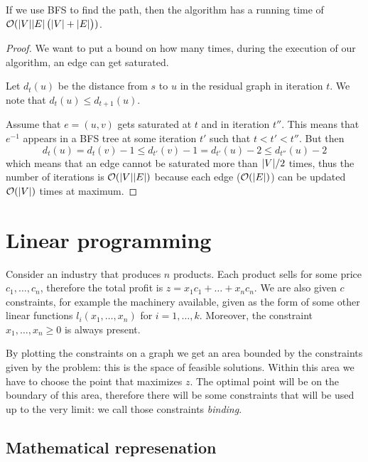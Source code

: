\documentclass[12pt]{extarticle}
\begin{document}
\begin{theorem}
    If we use BFS to find the path, then the algorithm has a running time of $\mathcal{O}(\abs{V} \abs{E} \left( \abs{V} + \abs{E} \right))$.
\end{theorem}

\begin{proof}
    We want to put a bound on how many times, during the execution of our algorithm, an edge can get saturated.

    Let $d_t(u)$ be the distance from $s$ to $u$ in the residual graph in iteration $t$.
    We note that $d_t(u) \leq d_{t+1}(u)$.

    Assume that $e = (u, v)$ gets saturated at $t$ and in iteration $t''$.
    This means that $e^{-1}$ appears in a BFS tree at some iteration $t'$ such that $t < t' < t''$.
    But then
    \begin{equation}
        d_t(u) = d_t(v)-1 \leq d_{t'}(v)-1 = d_{t'}(u)-2 \leq d_{t''}(u)-2
    \end{equation}
    which means that an edge cannot be saturated more than $\abs{V}/2$ times,
    thus the number of iterations is $\mathcal{O}(\abs{V}\abs{E})$ because each edge ($\mathcal{O}(\abs{E})$) can be updated $\mathcal{O}(\abs{V})$ times at maximum.
\end{proof}

\section{Linear programming}

Consider an industry that produces $n$ products.
Each product sells for some price $c_1, \ldots, c_n$, therefore the total profit is $z = x_1 c_1 + \dots + x_n c_n$.
We are also given $c$ constraints, for example the machinery available, given as the form of some other linear functions $l_i(x_1, \ldots, x_n)$ for $i = 1, \ldots, k$.
Moreover, the constraint $x_1, \ldots, x_n \geq 0$ is always present.

By plotting the constraints on a graph we get an area bounded by the constraints given by the problem: this is the space of feasible solutions.
Within this area we have to choose the point that maximizes $z$.
The optimal point will be on the boundary of this area, therefore there will be some constraints that will be used up to the very limit: we call those  constraints \textit{binding}.

\subsection{Mathematical represenation}
\end{document}

